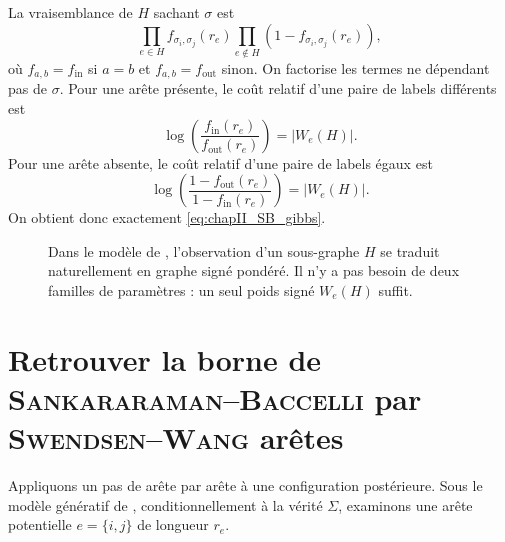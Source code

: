 \begin{Preuve}
La vraisemblance de $H$ sachant $\sigma$ est
\[
    \prod_{e\in H} f_{\sigma_i,\sigma_j}(r_e)
    \prod_{e\notin H}\left(1-f_{\sigma_i,\sigma_j}(r_e)\right),
\]
où $f_{a,b}=f_{\mathrm{in}}$ si $a=b$ et $f_{a,b}=f_{\mathrm{out}}$ sinon. On factorise les termes ne dépendant pas de $\sigma$. Pour une arête présente, le coût relatif d'une paire de labels différents est
\[
    \log\left(\frac{f_{\mathrm{in}}(r_e)}{f_{\mathrm{out}}(r_e)}\right)=|W_e(H)|.
\]
Pour une arête absente, le coût relatif d'une paire de labels égaux est
\[
    \log\left(\frac{1-f_{\mathrm{out}}(r_e)}{1-f_{\mathrm{in}}(r_e)}\right)=|W_e(H)|.
\]
On obtient donc exactement \eqref{eq:chapII_SB_gibbs}.
\end{Preuve}

\begin{figure}[H]
\centering
{}
\caption{Dans le modèle de \SB{}, l'observation d'un sous-graphe $H$ se traduit naturellement en graphe signé pondéré. Il n'y a pas besoin de deux familles de paramètres : un seul poids signé $W_e(H)$ suffit.}
\label{fig:chapII_SB_weights}
\end{figure}

\section{Retrouver la borne de \textsc{Sankararaman--Baccelli} par \textsc{Swendsen--Wang} arêtes}
\label{sec:chapII_SB_edges}

Appliquons un pas de \SW{} arête par arête à une configuration postérieure. Sous le modèle génératif de \SB{}, conditionnellement à la vérité $\Sigma$, examinons une arête potentielle $e=\{i,j\}$ de longueur $r_e$.

